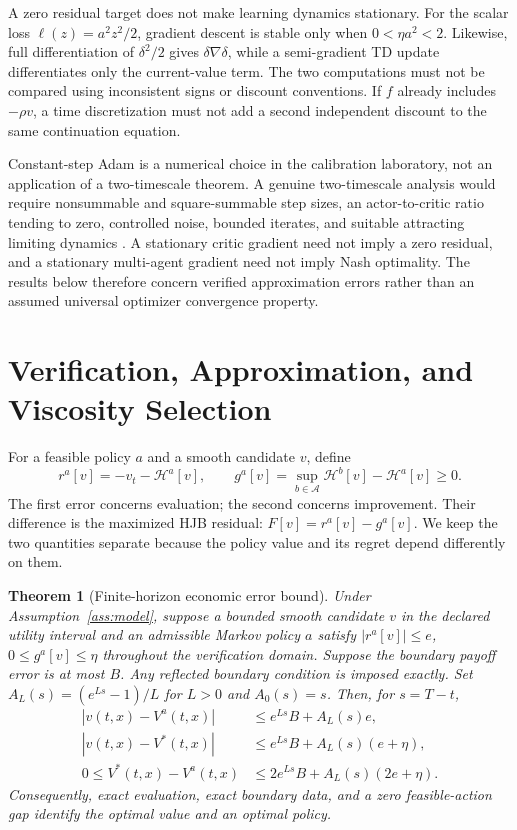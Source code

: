 \documentclass[ecta,draft]{econsocart}
\newtheorem{theorem}{Theorem}
\theoremstyle{definition}
\theoremstyle{remark}
\newcommand{\HH}{\mathcal H}
\newcommand{\Act}{\mathcal A}
\begin{document}
A zero residual target does not make learning dynamics stationary. For the scalar loss $\ell(z)=a^2z^2/2$, gradient descent is stable only when $0<\eta a^2<2$. Likewise, full differentiation of $\delta^2/2$ gives $\delta\nabla\delta$, while a semi-gradient TD update differentiates only the current-value term. The two computations must not be compared using inconsistent signs or discount conventions. If $f$ already includes $-\rho v$, a time discretization must not add a second independent discount to the same continuation equation.

Constant-step Adam is a numerical choice in the calibration laboratory, not an application of a two-timescale theorem. A genuine two-timescale analysis would require nonsummable and square-summable step sizes, an actor-to-critic ratio tending to zero, controlled noise, bounded iterates, and suitable attracting limiting dynamics \citep{borkar2024}. A stationary critic gradient need not imply a zero residual, and a stationary multi-agent gradient need not imply Nash optimality. The results below therefore concern verified approximation errors rather than an assumed universal optimizer convergence property.




\section{Verification, Approximation, and Viscosity Selection}\label{sec:theory}
For a feasible policy $a$ and a smooth candidate $v$, define
\begin{equation}\label{eq:errors}
 r^a[v]=-v_t-\HH^a[v],\qquad
 g^a[v]=\sup_{b\in\Act}\HH^b[v]-\HH^a[v]\geq0.
\end{equation}
The first error concerns evaluation; the second concerns improvement. Their difference is the maximized HJB residual: $F[v]=r^a[v]-g^a[v]$. We keep the two quantities separate because the policy value and its regret depend differently on them.

\begin{theorem}[Finite-horizon economic error bound]\label{thm:verification}
Under Assumption~\ref{ass:model}, suppose a bounded smooth candidate $v$ in the declared utility interval and an admissible Markov policy $a$ satisfy $|r^a[v]|\leq e$, $0\leq g^a[v]\leq\eta$ throughout the verification domain. Suppose the boundary payoff error is at most $B$. Any reflected boundary condition is imposed exactly. Set $A_L(s)=(e^{Ls}-1)/L$ for $L>0$ and $A_0(s)=s$. Then, for $s=T-t$,
\begin{align}
 |v(t,x)-V^a(t,x)|&\leq e^{Ls}B+A_L(s)e,\label{eq:policybound}\\
 |v(t,x)-V^*(t,x)|&\leq e^{Ls}B+A_L(s)(e+\eta),\label{eq:valuebound}\\
 0\leq V^*(t,x)-V^a(t,x)&\leq2e^{Ls}B+A_L(s)(2e+\eta).\label{eq:regret}
\end{align}
Consequently, exact evaluation, exact boundary data, and a zero feasible-action gap identify the optimal value and an optimal policy.
\end{theorem}
\end{document}
